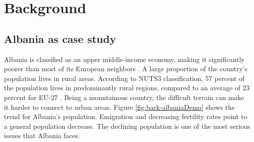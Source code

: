 
\chapter{Background}
\label{ch:background}



\section{Albania as case study}
Albania is classified as an upper middle-income economy, making it significantly poorer than most of its European neighbors \citep{theworldbankgroupWorldBankCountry2025}. A large proportion of the country's population lives in rural areas. According to NUTS3\citep{eurostatNUTSNomenclatureTerritorial2024} classification, 57 percent of the population lives in predominantly rural regions, compared to an average of 23 percent for EU-27 \citep{instatNewUrbanRuralClassification2014}. Being a mountainous country, the difficult terrain can make it harder to connect to urban areas. Figure \ref{fig:back-albaniaDemo} shows the trend for Albania's population. Emigration and decreasing fertility rates point to a general population decrease. The declining population is one of the most serious issues that Albania faces\citep{instytuteuropysrodkowejAlbaniaDemographicCrisis2021}.
